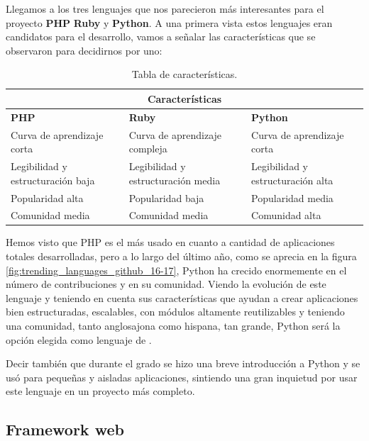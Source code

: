 \bigskip
Llegamos a los tres lenguajes que nos parecieron más interesantes para el proyecto \textbf{PHP} \textbf{Ruby} y \textbf{Python}. A una primera vista estos lenguajes eran candidatos para el desarrollo, vamos a señalar las características que se observaron para decidirnos por uno:


\bigskip
\begin{table}[htb]
\begin{tabular}{| p{4.2cm}| p{4.2cm} | p{4.2cm} |}
\hline
\multicolumn{3}{|c|}{\textbf{Características}} \\
\hline
\textbf{PHP} & \textbf{Ruby} & \textbf{Python} \\
\hline \hline \hline

Curva de aprendizaje corta & Curva de aprendizaje compleja & Curva de aprendizaje corta\\ \hline
Legibilidad y estructuración baja & Legibilidad y estructuración media & Legibilidad y estructuración alta \\ \hline
Popularidad alta & Popularidad baja & Popularidad media \\ \hline
Comunidad media & Comunidad media & Comunidad alta \\ \hline
\end{tabular}
\caption{Tabla de características.}
\label{tabla:anchofijo}
\end{table}

\bigskip
Hemos visto que PHP es el más usado en cuanto a cantidad de aplicaciones totales desarrolladas, pero a lo largo del último año, como se aprecia en la figura \ref{fig:trending_languages_github_16-17}, Python ha crecido enormemente en el número de contribuciones y en su comunidad. Viendo la evolución de este lenguaje y teniendo en cuenta sus características que ayudan a crear aplicaciones bien estructuradas, escalables, con módulos altamente reutilizables y teniendo una comunidad, tanto anglosajona como hispana, tan grande, Python será la opción elegida como lenguaje de \titulo .

\bigskip
Decir también que durante el grado se hizo una breve introducción a Python y se usó para pequeñas y aisladas aplicaciones, sintiendo una gran inquietud por usar este lenguaje en un proyecto más completo.




\subsection{Framework web}

